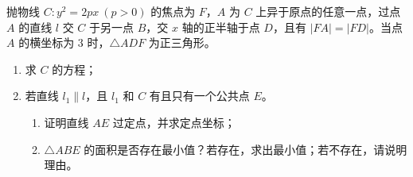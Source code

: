 \begin{example}
抛物线 \(C: y^2 = 2px\ (p>0)\) 的焦点为 \(F\)，\(A\) 为 \(C\) 上异于原点的任意一点，过点 \(A\) 的直线 \(l\) 交 \(C\) 于另一点 \(B\)，交 \(x\) 轴的正半轴于点 \(D\)，且有 \(|FA| = |FD|\)。当点 \(A\) 的横坐标为 \(3\) 时，\(\triangle ADF\) 为正三角形。
\begin{enumerate}
    \item[(1)] 求 \(C\) 的方程；
    \item[(2)] 若直线 \(l_1 \parallel l\)，且 \(l_1\) 和 \(C\) 有且只有一个公共点 \(E\)。
    \begin{enumerate}
        \item[(i)] 证明直线 \(AE\) 过定点，并求定点坐标；
        \item[(ii)] \(\triangle ABE\) 的面积是否存在最小值？若存在，求出最小值；若不存在，请说明理由。
    \end{enumerate}
\end{enumerate}
\end{example}
